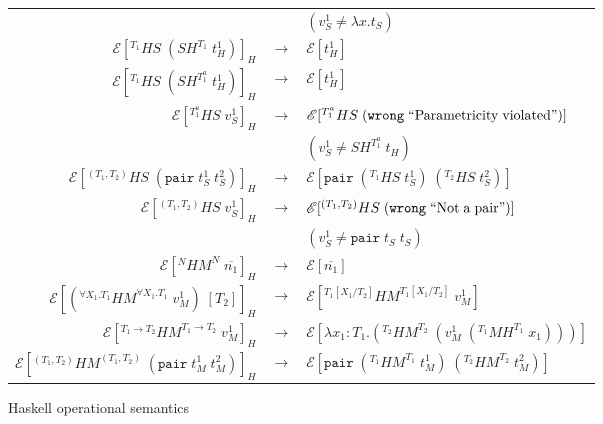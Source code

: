\begin{figure}
\begin{center}
\begin{tabular}{rcl}
&& $(v_{S}^{1}\neq\lambda x.t_{S})$ \\
$\mathscr{E}[^{T_{1}}HS\;(SH^{T_{1}}\;t_{H}^{1})]_{H}$ & $\rightarrow$ & $\mathscr{E}[t_{H}^{1}]$ \\
$\mathscr{E}[^{T_{1}}HS\;(SH^{T^{a}_{1}}\;t_{H}^{1})]_{H}$ & $\rightarrow$ & $\mathscr{E}[t_{H}^{1}]$ \\
$\mathscr{E}[^{T^{a}_{1}}HS\;v_{S}^{1}]_{H}$ & $\rightarrow$ & $\mathscr{E}[^{T^{a}_{1}}HS\;(\mathtt{wrong}\;\mathrm{``Parametricity\;violated"})]$ \\
&& $(v_{S}^{1}\neq SH^{T^{a}_{1}}\;t_{H})$ \\
$\mathscr{E}[^{(T_{1},T_{2})}HS\;(\mathtt{pair}\;t_{S}^{1}\;t_{S}^{2})]_{H}$ & $\rightarrow$ & $\mathscr{E}[\mathtt{pair}\;(^{T_{1}}HS\;t_{S}^{1})\;(^{T_{2}}HS\;t_{S}^{2})]$ \\
$\mathscr{E}[^{(T_{1},T_{2})}HS\;v_{S}^{1}]_{H}$ & $\rightarrow$ & $\mathscr{E}[^{(T_{1},T_{2})}HS\;(\mathtt{wrong}\;\mathrm{``Not\;a\;pair"})]$ \\
&& $(v_{S}^{1}\neq\mathtt{pair}\;t_{S}\;t_{S})$ \\
$\mathscr{E}[^{N}HM^{N}\;\overline{n_{1}}]_{H}$ & $\rightarrow$ & $\mathscr{E}[\overline{n_{1}}]$ \\
$\mathscr{E}[(^{\forall X_{1}.T_{1}}HM^{\forall X_{1}.T_{1}}\;v_{M}^{1})\;[T_{2}]]_{H}$ & $\rightarrow$ & $\mathscr{E}[^{T_{1}[X_{1}/T_{2}]}HM^{T_{1}[X_{1}/T_{2}]}\;v_{M}^{1}]$ \\
$\mathscr{E}[^{T_{1}\rightarrow T_{2}}HM^{T_{1}\rightarrow T_{2}}\;v_{M}^{1}]_{H}$ & $\rightarrow$ & $\mathscr{E}[\lambda x_{1}:T_{1}.(^{T_{2}}HM^{T_{2}}\;(v_{M}^{1}\;(^{T_{1}}MH^{T_{1}}\;x_{1})))]$ \\
$\mathscr{E}[^{(T_{1},T_{2})}HM^{(T_{1},T_{2})}\;(\mathtt{pair}\;t_{M}^{1}\;t_{M}^{2})]_{H}$ & $\rightarrow$ & $\mathscr{E}[\mathtt{pair}\;(^{T_{1}}HM^{T_{1}}\;t_{M}^{1})\;(^{T_{2}}HM^{T_{2}}\;t_{M}^{2})]$ \\
\end{tabular}
\caption{Haskell operational semantics}
\label{fig:hos}
\end{center}
\end{figure}